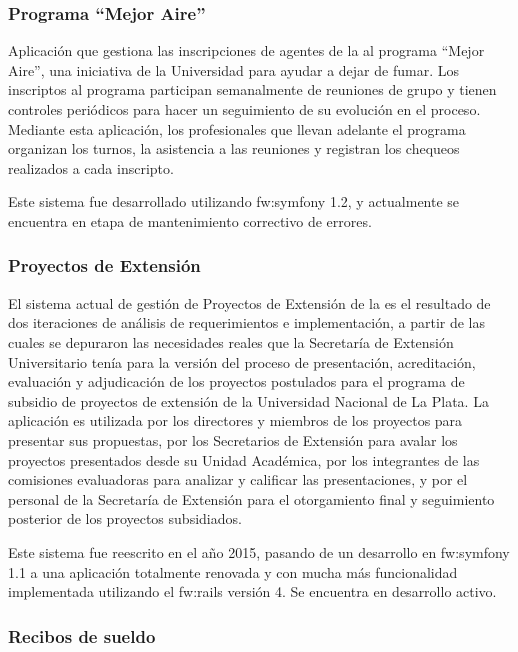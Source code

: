 \subsubsection{Programa ``Mejor Aire''}
\label{anexo:detalle-clientes:mejor-aire}

Aplicación que gestiona las inscripciones de agentes de la \unlp al programa ``Mejor Aire'', una iniciativa de la Universidad para ayudar a dejar de fumar. Los inscriptos al programa participan semanalmente de reuniones de grupo y tienen controles periódicos para hacer un seguimiento de su evolución en el proceso. Mediante esta aplicación, los profesionales que llevan adelante el programa organizan los turnos, la asistencia a las reuniones y registran los chequeos realizados a cada inscripto.

Este sistema fue desarrollado utilizando \gls{fw:symfony} 1.2, y actualmente se encuentra en etapa de mantenimiento correctivo de errores.


\subsubsection{Proyectos de Extensión}
\label{anexo:detalle-clientes:extension}

El sistema actual de gestión de Proyectos de Extensión de la \unlp es el resultado de dos iteraciones de análisis de requerimientos e implementación, a partir de las cuales se depuraron las necesidades reales que la Secretaría de Extensión Universitario tenía para la versión  del proceso de presentación, acreditación, evaluación y adjudicación de los proyectos postulados para el programa de subsidio de proyectos de extensión de la Universidad Nacional de La Plata. La aplicación es utilizada por los directores y miembros de los proyectos para presentar sus propuestas, por los Secretarios de Extensión para avalar los proyectos presentados desde su Unidad Académica, por los integrantes de las comisiones evaluadoras para analizar y calificar las presentaciones, y por el personal de la Secretaría de Extensión para el otorgamiento final y seguimiento posterior de los proyectos subsidiados.

Este sistema fue reescrito en el año 2015, pasando de un desarrollo en \gls{fw:symfony} 1.1 a una aplicación totalmente renovada y con mucha más funcionalidad implementada utilizando el  \gls{fw:rails} versión 4. Se encuentra en desarrollo activo.


\subsubsection{Recibos de sueldo}
\label{anexo:detalle-clientes:recibos}

